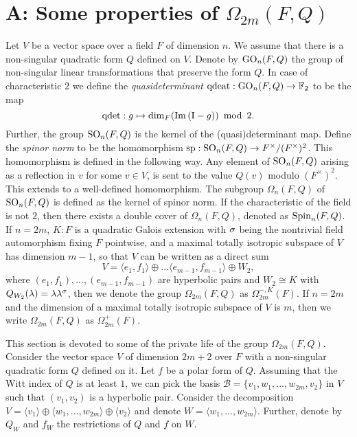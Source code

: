 \chapter{A: Some properties of $\Omega_{2m}(F,Q)$}
\label{AppA}

Let $V$ be a vector space over a field $F$ of dimension $n$. We assume that there is a 
non-singular quadratic form $Q$ defined on $V$. Denote by $\mathrm{GO}_n(F,Q)$ the group of 
non-singular linear transformations that preserve the
form $Q$. In case of characteristic $2$ we define the \textit{quasideterminant}
$\mathrm{qdeat}:\mathrm{GO}_n(F,Q) \rightarrow \mathbb{F}_2$ to be the map
\begin{equation}
    \operatorname{qdet}: g \mapsto \dim_F ( \mathrm{Im}\,(\mathord{\mathrm{I}} - g) )\ \operatorname{mod}\ 2.
\end{equation}
Further, the group $\mathrm{SO}_n(F,Q)$ is the kernel of the (quasi)determinant map. Define the 
\textit{spinor norm} to be the homomorphism $\mathrm{sp} : \mathrm{SO}_n(F,Q) \rightarrow F^{\times} / 
(F^{\times})^2$. This homomorphism is defined in the following way. Any element of 
$\mathrm{SO}_n(F,Q)$ arising as a reflection in $v$ for some $v \in V$, is sent to the value
$Q(v)$ modulo $(F^{\times})^2$. This extends to a well-defined homomorphism. The subgroup
$\Omega_n(F, Q)$ of $\mathrm{SO}_n(F,Q)$ is defined as the kernel of spinor norm. If the characteristic 
of the field is not $2$, then there exists a double cover of $\Omega_n(F,Q)$, denoted as
$\mathrm{Spin}_n(F,Q)$. If $n = 2m$, $K:F$ is a 
quadratic Galois extension with $\sigma$ being the
nontrivial field automorphism fixing $F$
pointwise, and a maximal
totally isotropic subspace of $V$ has dimension
$m-1$, so that $V$ can be written as a direct
sum
\begin{equation}
V = \langle e_1, f_1 \rangle \oplus ...
\langle e_{m-1}, f_{m-1} \rangle \oplus 
W_2,	
\end{equation}
where $(e_1,f_1),...,(e_{m-1},f_{m-1})$ are
hyperbolic pairs and $W_2 \cong K$ with 
$Q_{W_2}(\lambda) = \lambda \lambda^{\sigma}$,
then we denote the group $\Omega_{2m}(F,Q)$
as $\Omega_{2m}^{-,K}(F)$. If $n = 2m$ and 
the dimension of a maximal totally isotropic 
subspace of $V$ is $m$, then we write
$\Omega_{2m}(F,Q)$ as $\Omega_{2m}^+(F)$.

This section is devoted to some of the private life of the group $\Omega_{2m}(F,Q)$.
Consider the vector space $V$ of dimension
$2m+2$ over $F$ with a non-singular quadratic form $Q$ defined on it. 
Let $f$ be a polar form of $Q$. 
Assuming that the Witt index of $Q$ is at least $1$, we can pick 
the basis $\mathcal{B} = \{v_1, w_1,...,w_{2m}, v_2\}$ in $V$ such that $(v_1,v_2)$ 
is a hyperbolic pair. Consider the decomposition $V = \langle v_1 \rangle \oplus
\langle w_1, ..., w_{2m} \rangle \oplus \langle v_2 \rangle$ and denote 
$W = \langle w_1, ..., w_{2m} \rangle$. Further, denote by $Q_W$ and $f_W$ the restrictions of 
$Q$ and $f$ on $W$.

